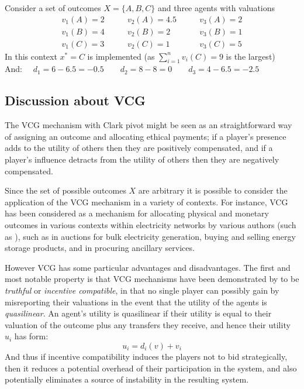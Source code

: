 \begin{example}
Consider a set of outcomes $X = \{A,B,C\}$ and three agents with valuations 
$$\begin{matrix}v_1(A) = 2\\v_1(B) = 4\\v_1(C) = 3\end{matrix}\quad\quad
\begin{matrix}v_2(A) = 4.5\\v_2(B) = 2\\v_2(C) = 1\end{matrix}\quad\quad
\begin{matrix}v_3(A) = 2\\v_3(B) = 1\\v_3(C) = 5\end{matrix}$$
In this context $x^* = C$ is implemented (as $\sum_{i=1}^nv_i(C)=9$ is the largest)\\And:
$\quad d_1 = 6-6.5 = -0.5 \quad\quad d_2 = 8-8 = 0\quad\quad d_3 = 4-6.5 = -2.5 $
\end{example}

\subsection{Discussion about VCG}
The VCG mechanism with Clark pivot might be seen as an straightforward way of assigning an outcome and allocating ethical payments; if a player's presence adds to the utility of others then they are positively compensated, and if a player's influence detracts from the utility of others then they are negatively compensated.

Since the set of possible outcomes $X$ are arbitrary it is possible to consider the application of the VCG mechanism in a variety of contexts.	
For instance, VCG has been considered as a mechanism for allocating physical and monetary outcomes in various contexts within electricity networks by various authors (such as \citep{FABRA200272, SESSA2017189, 8264596, 7512339}), such as in auctions for bulk electricity generation, buying and selling energy storage products, and in procuring ancillary services.

However VCG has some particular advantages and disadvantages.
The first and most notable property is that VCG mechanisms have been demonstrated by \cite{roberts1979characterization, Lavi2008} to be \textit{truthful} or \textit{incentive compatible}, in that no single player can possibly gain by misreporting their valuations in the event that the utility of the agents is \textit{quasilinear}.
An agent's utility is quasilinear if their utility is equal to their valuation of the outcome plus any transfers they receive, and hence their utility $u_i$ has form:
$$ u_i = d_i(v)+v_i $$
And thus if incentive compatibility induces the players not to bid strategically, then it reduces a potential overhead of their participation in the system, and also potentially eliminates a source of instability in the resulting system.

